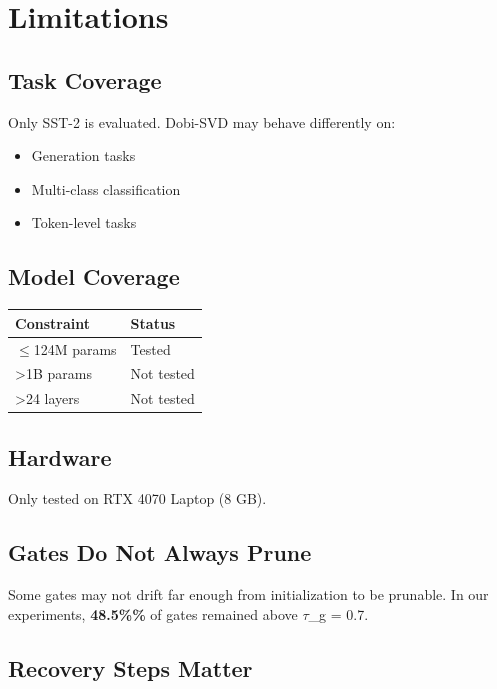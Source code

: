
\section{Limitations}

\subsection{Task Coverage}

Only SST-2 is evaluated. Dobi-SVD may behave differently on:
\begin{itemize}
\item Generation tasks
\item Multi-class classification
\item Token-level tasks

\end{itemize}
\subsection{Model Coverage}

\begin{table}[H]
\centering
\small
\begin{tabular}{ll}
\toprule
\textbf{Constraint} & \textbf{Status} \\
\midrule
$\le$124M params & Tested \\
>1B params & Not tested \\
>24 layers & Not tested \\
\bottomrule
\end{tabular}
\end{table}

\subsection{Hardware}

Only tested on RTX 4070 Laptop (8 GB).

\subsection{Gates Do Not Always Prune}

Some gates may not drift far enough from initialization to be prunable. In 
our experiments, \textbf{48.5\%\%} of gates remained above $\tau$\_g = 0.7.

\subsection{Recovery Steps Matter}

